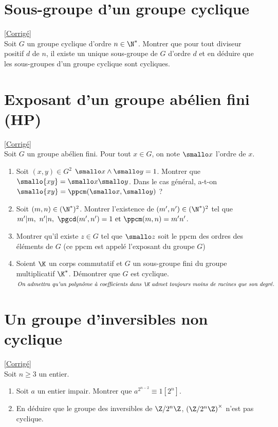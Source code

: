 \documentclass[8pt]{book}
\begin{document}
	\section{Sous-groupe d'un groupe cyclique }
	\label{Sous-groupe d'un groupe cyclique}
	\textcolor{blue}{\hyperref[Sous-groupe d'un groupe cyclique corrigé]{[Corrigé]}}\\
	Soit $G$ un groupe cyclique d'ordre $n\in \N^*$. Montrer que pour tout diviseur positif $d$ de $n$, il existe un unique sous-groupe de $G$ d'ordre $d$ et en déduire que les sous-groupes d'un groupe cyclique sont cycliques.
	
	\section{Exposant d'un groupe abélien fini  (HP)}
	\label{Exposant d'un groupe abélien fini}
	\textcolor{blue}{\hyperref[Exposant d'un groupe abélien fini corrigé]{[Corrigé]}}\\
	Soit $G$ un groupe abélien fini. Pour tout $x\in G$, on note $\smallo x$ l'ordre de $x$.
	\begin{enumerate}[leftmargin=*]
		\item Soit $(x,y)\in G^2$ $\smallo x\wedge \smallo y=1$. Montrer que $\smallo{xy}=\smallo x\smallo y$. Dans le cas général, a-t-on $\smallo{xy}=\ppcm(\smallo x,\smallo y)$ ?
		\item Soit $(m,n)\in (\N^*)^2$. Montrer l'existence de $(m',n')\in (\N^*)^2$ tel que $m'|m,\ n'|n,\ \pgcd(m',n')=1 \text{ et } \ppcm(m,n)=m'n'$.
		\item Montrer qu'il existe $z\in G$ tel que $\smallo z$ soit le ppcm des ordres des éléments de $G$ (ce ppcm est appelé l'exposant du groupe $G$)
		\item Soient $\K$ un corps commutatif et $G$ un sous-groupe fini du groupe multiplicatif $\K^*$. Démontrer que $G$ est cyclique.\\
		$\textit{On admettra qu'un polynôme à coefficients dans $\K$ admet toujours moins de racines que son degré.}$
	\end{enumerate}
	
	\section{Un groupe d'inversibles non cyclique }
	\label{Un groupe d'inversibles non cyclique}
	\textcolor{blue}{\hyperref[Un groupe d'inversibles non cyclique corrigé]{[Corrigé]}}\\
	Soit $n\geq 3$ un entier.
	\begin{enumerate}
		\item Soit $a$ un entier impair. Montrer que $a^{2^{n-2}}\equiv1[2^n]$.
		\item En déduire que le groupe des inversibles de $\Z/2^n\Z$, $\left(\Z/2^n\Z\right)^\times$ n'est pas cyclique.
	\end{enumerate}
	
\end{document}
